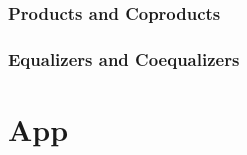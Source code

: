 \documentclass{book}
\theoremstyle{definition}
\DeclareMathOperator*{\0}{\mbf{0}}
\DeclareMathOperator*{\1}{\mbf{1}}
\begin{document}
	
	
	
	
	
	
	
	
	
	
	
	
	
	
	
	
	
	
	\subsection{Products and Coproducts}
	
	
	
	
	
	
	
	
	
	
	
	
	
	
	
	\subsection{Equalizers and Coequalizers}
	
	

	
	
	
	
	
	
	
	
	
	
	
	
	
	

	
	
	
	
	
	
	
	
	
	
	
	
	
	
	
	
	
	
	
	
	
	
	
	
	\appendix
	\chapter{App}
	
	
	
	
	
	
	
	\backmatter
	
	
	
	
	
	
	
	
	
	
	
	
	
	
\end{document}
